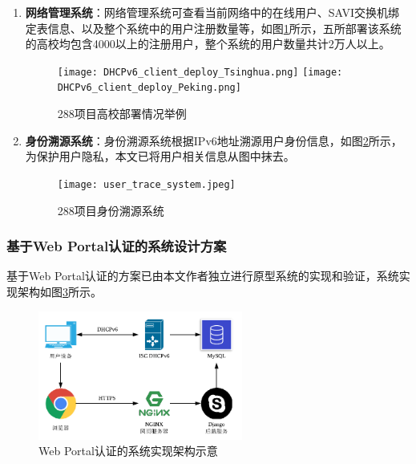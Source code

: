 \begin{enumerate}[1{)}]
          \item \textbf{网络管理系统}：网络管理系统可查看当前网络中的在线用户、SAVI交换机绑定表信息、以及整个系统中的用户注册数量等，如图\ref{fig:DHCPv6_client_deploy_result}所示，五所部署该系统的高校均包含4000以上的注册用户，整个系统的用户数量共计2万人以上。
            \begin{figure}[ht]
              \centering
              {\texttt{[image: DHCPv6\_client\_deploy\_Tsinghua.png]}}
              {\texttt{[image: DHCPv6\_client\_deploy\_Peking.png]}}
              \caption{288项目高校部署情况举例}
              \label{fig:DHCPv6_client_deploy_result}
            \end{figure}
          \item \textbf{身份溯源系统}：身份溯源系统根据IPv6地址溯源用户身份信息，如图\ref{fig:user_trace_system}所示，为保护用户隐私，本文已将用户相关信息从图中抹去。
            \begin{figure}[ht]
              \centering
              \texttt{[image: user\_trace\_system.jpeg]}
              \caption{288项目身份溯源系统}
              \label{fig:user_trace_system}
            \end{figure}
        \end{enumerate}
    
        \subsubsection{基于Web Portal认证的系统设计方案}
        \label{NIDTGA:DHCPv6:implement:portal}
        基于Web Portal认证的方案已由本文作者独立进行原型系统的实现和验证，系统实现架构如图\ref{fig:DHCPv6_web_portal_implementation}所示。
        \begin{figure}[ht]
          \centering
          \includegraphics[width=0.6\textwidth]{figures/DHCPv6_web_portal_implementation.png}
          \caption{Web Portal认证的系统实现架构示意}
          \label{fig:DHCPv6_web_portal_implementation}
        \end{figure}
        
